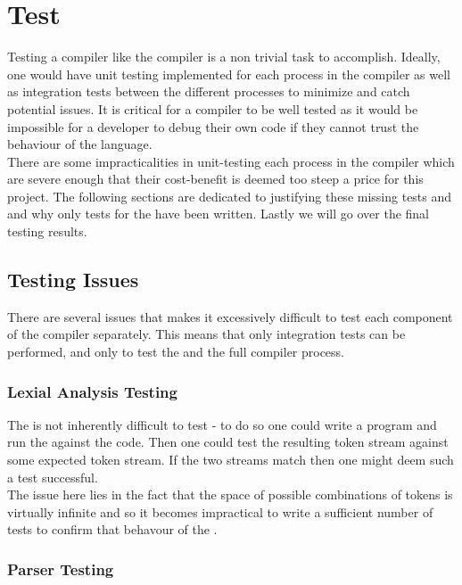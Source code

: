 \section{Test}
\label{sec:Test}

Testing a compiler like the \lang{} compiler is a non trivial task to
accomplish. Ideally, one would have unit testing implemented for each process in the
compiler as well as integration tests between the different processes to minimize and
catch potential issues. It is critical for a compiler to be well tested as it would
be impossible for a developer to debug their own code if they cannot trust the
behaviour of the language. \\

There are some impracticalities in unit-testing each process in the \lang{} compiler
which are severe enough that their cost-benefit is deemed too steep a price for this
project. The following sections are dedicated to justifying these missing tests and
and why only tests for the \borrowChecker{} have been written.
Lastly we will go over the final testing results.

\subsection{Testing Issues}

There are several issues that makes it excessively difficult to test each component of
the \lang{} compiler separately. This means that only integration tests can be
performed, and only to test the \borrowChecker{} and the full compiler process. 

\subsubsection{Lexial Analysis Testing}

The \lexer{} is not inherently difficult to test - to do so one could write a program
and run the \lexer{} against the code. Then one could test the resulting token stream
against some expected token stream. If the two streams match then one might deem
such a test successful. \\

The issue here lies in the fact that the space of possible combinations of tokens is virtually
infinite and so it becomes impractical to write a sufficient number of tests to
confirm that behavour of the \lexer{}.

\subsubsection{Parser Testing}

